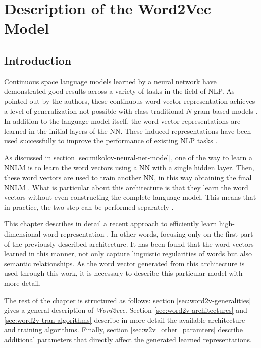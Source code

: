 \chapter{Description of the Word2Vec Model }
\label{chap:word2vec_description}


\section{Introduction}
Continuous space language  models
learned by a neural network have
demonstrated good results across a variety of tasks in the field of \ac{NLP}.  As pointed out by
the authors, these continuous word vector representation achieves a level of
generalization not possible with class traditional $N$-gram based models
\cite{conf/icassp/MikolovKBGC09}. In addition to the language model itself,
the word vector representations are learned in the initial layers of the
\ac{NN}. These 
induced representations  have been used successfully to improve the
performance of existing \ac{NLP} tasks \cite{collobert:2008}
\cite{Turian:2010:WRS:1858681.1858721}. 

As discussed in section \ref{sec:mikolov-neural-net-model},  one of the way to learn a
\ac{NNLM} is to learn the word vectors using  a \ac{NN} with a single hidden
layer. Then, these word vectors are used to  train another \ac{NN}, in this 
way obtaining   the final \ac{NNLM} \cite{conf/icassp/MikolovKBGC09}.   
What is particular about this architecture is that they learn the  word
vectors without  even constructing the complete language model.  This means
that in practice,  the two step can be performed separately \cite{conf/icassp/MikolovKBGC09}. 

This chapter describes in detail a recent approach to efficiently learn
high-dimensional word representation \cite{DBLP:journals/corr/abs-1301-3781}.
In other words, focusing only on the first part of the previously described 
architecture. It has been found that the word vectors learned in this manner,
not only capture linguistic regularities of words  but also semantic
relationships. As the word vector generated from this architecture is used 
through this work, it is necessary to describe this particular model with more
detail.

The rest of the chapter is structured as follows: section
\ref{sec:word2v-generalities} gives a general description of
\textit{Word2vec}.  Section \ref{sec:word2v-architectures} and
\ref{sec:word2v-tran-algorithms} describe in more detail the available
architecture and training algorithms. Finally, section
\ref{sec:w2v_other_paramters} describe additional  parameters that
directly affect the generated learned representations.

